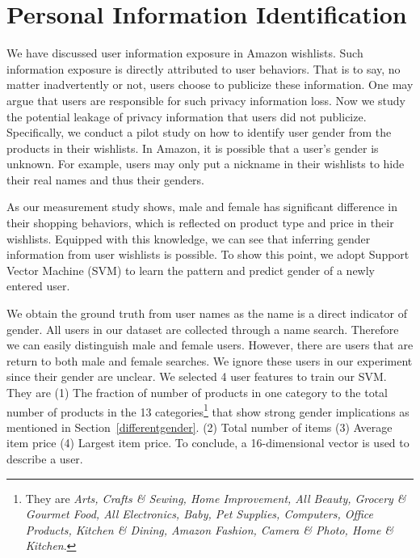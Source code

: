 \section{Personal Information Identification}
We have discussed user information exposure in Amazon wishlists. Such information exposure is directly attributed to user behaviors. That is to say, no matter inadvertently or not, users choose to publicize these information. One may argue that users are responsible for such privacy information loss. Now we study the potential leakage of privacy information that users did not publicize. Specifically, we conduct a pilot study on how to identify user gender from the products in their wishlists. In Amazon, it is possible that a user's gender is unknown. For example, users may only put a nickname in their wishlists to hide their real names and thus their genders.

As our measurement study shows, male and female has significant difference in their shopping behaviors, which is reflected on product type and price in their wishlists. Equipped with this knowledge, we can see that inferring gender information from user wishlists is possible. To show this point, we adopt Support Vector Machine (SVM) to learn the pattern and predict gender of a newly entered user. 

We obtain the ground truth from user names as the name is a direct indicator of gender. All users in our dataset are collected through a name search. Therefore we can easily distinguish male and female users. However, there are users that are return to both male and female searches. We ignore these users in our experiment since their gender are unclear. We selected 4 user features to train our SVM. They are (1) The fraction of number of products in one category to the total number of products in the 13 categories\footnote{They are \textit{Arts, Crafts \& Sewing, Home Improvement, All Beauty, Grocery \& Gourmet Food, All Electronics, Baby, Pet Supplies, Computers, Office Products, Kitchen \& Dining, Amazon Fashion, Camera \& Photo, Home \& Kitchen}.} that show strong gender implications as mentioned in Section~\ref{differentgender}. (2) Total number of items (3) Average item price (4) Largest item price. To conclude, a 16-dimensional vector is used to describe a user. 


